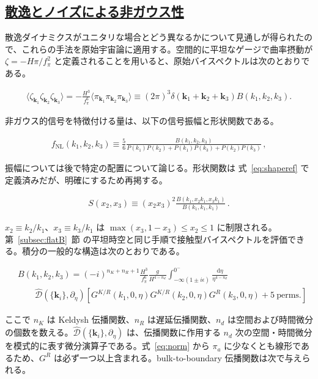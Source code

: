 \documentclass[a4paper,11pt]{ltjsarticle}
\newcommand{\subsectionlink}[1]{\subsection[#1]{\hyperlink{toc}{#1}}}
\numberwithin{equation}{section}
\def\pia{\pi_{a}}
\newcommand{\dd}{\mathrm{d}}
\newcommand{\boldmathsymbol}[1]{{\ensuremath{\boldsymbol{#1}}}}
\newcommand{\bmk}{\boldmathsymbol{k}}
\newcommand{\Eq}[1]{Eq.~(\ref{#1})}
\newcommand{\Sec}[1]{Sec.~\ref{#1}}
\def\bmk{{\boldsymbol{k}}}
\renewcommand{\Eq}[1]{式~\eqref{#1}}
\renewcommand{\Sec}[1]{第~\ref{#1}~節}
\begin{document}
\subsectionlink{散逸とノイズによる非ガウス性}\label{subsec:bispecdS}

散逸ダイナミクスがユニタリな場合とどう異なるかについて見通しが得られたので、これらの手法を原始宇宙論に適用する。空間的に平坦なゲージで曲率摂動が $\zeta=-H\pi/f_\pi^2$ と定義されることを用いると、原始バイスペクトルは次のとおりである。

\begin{align}
    \langle \zeta_{\bmk_1}  \zeta_{\bmk_2}  \zeta_{\bmk_3} \rangle  = - \frac{H^3}{f_\pi^6}	\langle \pi_{\bmk_1}  \pi_{\bmk_2}  \pi_{\bmk_3} \rangle \equiv (2\pi)^3 \delta(\bmk_1 + \bmk_2 + \bmk_3) B(k_1,k_2,k_3).
\end{align}

非ガウス的信号を特徴付ける量は、以下の信号振幅と形状関数である。

\begin{align}
    f_{\mathrm{NL}}(k_1,k_2,k_3) \equiv \frac{5}{6} \frac{B(k_1,k_2,k_3)}{P(k_1) P(k_2) +  P(k_1) P(k_3)  + P(k_2) P(k_3) }\,,
\end{align}

振幅については後で特定の配置について論じる。形状関数は \Eq{eq:shaperef} で定義済みだが、明確にするため再掲する。

\begin{align}
    S(x_2,x_3) \equiv (x_2 x_3)^2 \frac{B(k_1, x_2 k_1, x_3 k_1)}{B(k_1,k_1,k_1)}\,.
\end{align}

$x_2\equiv k_2/k_1$、$x_3\equiv k_3/k_1$ は $\max(x_3,1-x_3)\leq x_2\leq1$ に制限される。\Sec{subsec:flatB} の平坦時空と同じ手順で接触型バイスペクトルを評価できる。積分の一般的な構造は次のとおりである。

\begin{align}\label{eq:Bexpref}
    &B(k_1,k_2,k_3) = (-i)^{n_K + n_R + 1}\frac{H^3}{f_\pi^6} \frac{g}{H^{4-n_d}} \int_{-\infty(1 \pm i \epsilon)}^{0^-} \frac{\dd \eta}{\eta^{4-n_d}} \nonumber \\
    &\qquad \widehat{\mathcal{D}}(\{\bmk_i\}, \partial_\eta)\left[ G^{K/R}(k_1, 0, \eta) G^{K/R}(k_2, 0, \eta) G^R(k_3, 0, \eta) + 5~\mathrm{perms}. \right]
\end{align}

ここで $n_K$ は Keldysh 伝播関数、$n_R$ は遅延伝播関数、$n_d$ は空間および時間微分の個数を数える。$\widehat{\mathcal{D}}(\{\bmk_i\},\partial_\eta)$ は、伝播関数に作用する $n_d$ 次の空間・時間微分を模式的に表す微分演算子である。\Eq{eq:norm} から $\pia$ に少なくとも線形であるため、$G^R$ は必ず一つ以上含まれる。bulk-to-boundary 伝播関数は次で与えられる。
\end{document}
